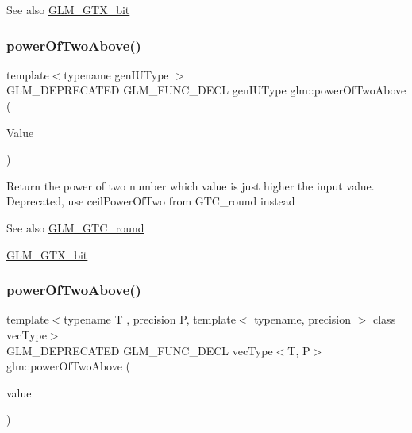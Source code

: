 \begin{DoxySeeAlso}{See also}
\hyperlink{group__gtx__bit}{G\+L\+M\+\_\+\+G\+T\+X\+\_\+bit} 
\end{DoxySeeAlso}
\mbox{\label{group__gtx__bit_ga8cda2459871f574a0aecbe702ac93291}} 
\subsubsection{\texorpdfstring{power\+Of\+Two\+Above()}{powerOfTwoAbove()}\hspace{0.1cm}{\footnotesize\ttfamily [1/2]}}
{\footnotesize\ttfamily template$<$typename gen\+I\+U\+Type $>$ \\
G\+L\+M\+\_\+\+D\+E\+P\+R\+E\+C\+A\+T\+ED G\+L\+M\+\_\+\+F\+U\+N\+C\+\_\+\+D\+E\+CL gen\+I\+U\+Type glm\+::power\+Of\+Two\+Above (\begin{DoxyParamCaption}\item[{gen\+I\+U\+Type}]{Value }\end{DoxyParamCaption})}

Return the power of two number which value is just higher the input value. Deprecated, use ceil\+Power\+Of\+Two from G\+T\+C\+\_\+round instead

\begin{DoxySeeAlso}{See also}
\hyperlink{group__gtc__round}{G\+L\+M\+\_\+\+G\+T\+C\+\_\+round} 

\hyperlink{group__gtx__bit}{G\+L\+M\+\_\+\+G\+T\+X\+\_\+bit} 
\end{DoxySeeAlso}
\mbox{\label{group__gtx__bit_gafe08808a50226b75b50e640a08b32ddc}} 
\subsubsection{\texorpdfstring{power\+Of\+Two\+Above()}{powerOfTwoAbove()}\hspace{0.1cm}{\footnotesize\ttfamily [2/2]}}
{\footnotesize\ttfamily template$<$typename T , precision P, template$<$ typename, precision $>$ class vec\+Type$>$ \\
G\+L\+M\+\_\+\+D\+E\+P\+R\+E\+C\+A\+T\+ED G\+L\+M\+\_\+\+F\+U\+N\+C\+\_\+\+D\+E\+CL vec\+Type$<$T, P$>$ glm\+::power\+Of\+Two\+Above (\begin{DoxyParamCaption}\item[{vec\+Type$<$ T, P $>$ const \&}]{value }\end{DoxyParamCaption})}

